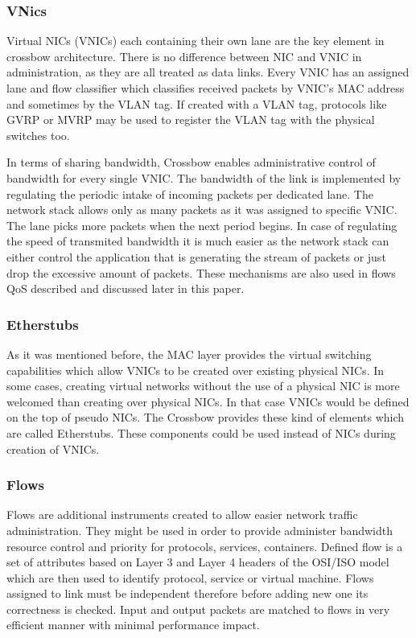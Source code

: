 \documentclass[11pt]{book}
\begin{document}
      \subsubsection{VNics}
      
        Virtual NICs (VNICs) each containing their own lane are the key element in crossbow architecture. There is no
        difference between NIC and VNIC in administration, as they are all treated as data links. Every VNIC has an
        assigned lane and flow classifier which classifies received packets by VNIC's MAC address and sometimes by the
        VLAN tag.  If created with a VLAN tag, protocols like GVRP or MVRP may be used to register the VLAN tag with the
        physical switches too.	

        In terms of sharing bandwidth, Crossbow enables administrative control of bandwidth for every single VNIC. The
        bandwidth of the link is implemented by regulating the periodic intake of incoming packets per dedicated lane. The
        network stack allows only as many packets as it was assigned to specific VNIC. The lane picks more packets when
        the next period begins. In case of regulating the speed of transmited bandwidth it is much easier as the network
        stack can either control the application that is generating the stream of packets or just drop the excessive
        amount of packets.  These mechanisms are also used in flows QoS described and discussed later in this paper.


      \subsubsection{Etherstubs}

        As it was mentioned before, the MAC layer provides the virtual switching capabilities which allow VNICs to be
        created over existing physical NICs.  In some cases, creating virtual networks without the use of a physical NIC
        is more welcomed than creating over physical NICs. In that case VNICs would be defined on the top of pseudo NICs.
        The Crossbow provides these kind of elements which are called Etherstubs. These components could be used instead
        of NICs during creation of VNICs.


      \subsubsection{Flows}

        Flows are additional instruments created to allow easier network traffic administration. They might be used in
        order to provide administer bandwidth resource control and priority for protocols, services, containers.  Defined
        flow is a set of attributes based on Layer 3 and Layer 4 headers of the OSI/ISO model which are then used to
        identify protocol, service or virtual machine.  Flows assigned to link must be independent therefore before adding
        new one its correctness is checked. Input and output packets are matched to flows in very efficient manner with
        minimal performance impact.
\end{document}
